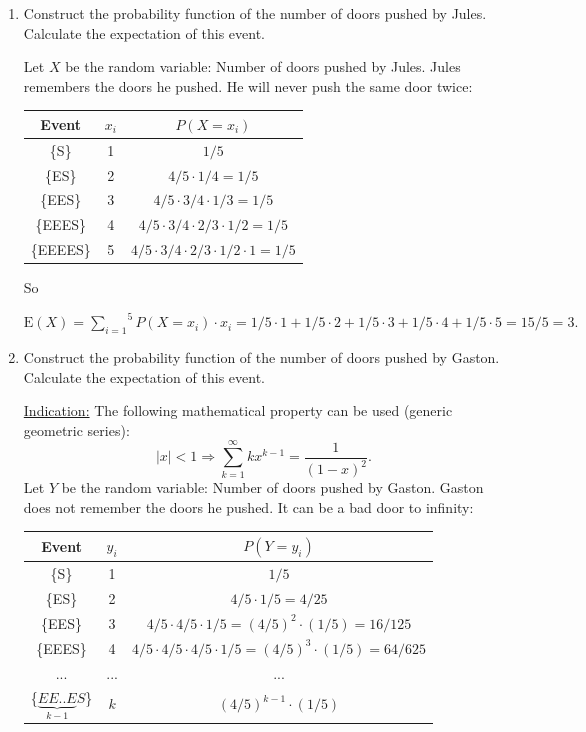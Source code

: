\documentclass[12pt,thmsa]{article}
\begin{document}
\begin{enumerate}%
\item Construct the probability function of the number of doors pushed by Jules. Calculate the expectation of this event.

Let $X$ be the random variable: Number of doors pushed by Jules. Jules remembers the doors he pushed. He will never push the same door twice:

\begin{center}
\begin{tabular}{|c|c|c|}
\hline
Event & $x_i$ & $P(X=x_i)$ \\[1mm]
\hline
\{S\} & 1 & $1/5$\\[1mm]
\hline
\{ES\} & 2 & $4/5\cdot 1/4=1/5$\\[1mm]
\hline
\{EES\} & 3 & $4/5\cdot 3/4\cdot 1/3=1/5$\\[1mm]
\hline
\{EEES\} & 4 & $4/5\cdot 3/4\cdot 2/3\cdot 1/2=1/5$\\[1mm]
\hline
\{EEEES\} & 5 & $4/5\cdot 3/4\cdot 2/3\cdot 1/2\cdot1=1/5$\\[1mm]
\hline
\end{tabular}
\end{center}

So
\begin{center}
$\mbox{E}(X) = \overset{5}{\underset{i=1}{\sum}}P(X=x_i)\cdot x_i = 1/5\cdot1+1/5\cdot2+1/5\cdot3+1/5\cdot4+1/5\cdot5=15/5=3. $
\end{center}

\item Construct the probability function of the number of doors pushed by Gaston. Calculate the expectation of this event.

\noindent \underline{Indication:} The following mathematical property can be used (generic geometric series):
$$|x|<1 \Rightarrow \sum_{k=1}^{\infty} k x^{k-1} = \frac{1}{(1-x)^2}.$$
Let $ Y $ be the random variable: Number of doors pushed by Gaston. Gaston does not remember the doors he pushed. It can be a bad door to infinity:
\begin{center}
\begin{tabular}{|c|c|c|}
\hline
Event & $y_i$ & $P(Y=y_i)$ \\[1mm]
\hline
\{S\} & 1 & $1/5$\\[1mm]
\hline
\{ES\} & 2 & $4/5\cdot 1/5=4/25$\\[1mm]
\hline
\{EES\} & 3 & $4/5\cdot 4/5\cdot 1/5=(4/5)^2\cdot(1/5)=16/125$\\[1mm]
\hline
\{EEES\} & 4 & $4/5\cdot 4/5\cdot 4/5\cdot 1/5=(4/5)^3\cdot(1/5)=64/625 $\\[1mm]
\hline
... & ... & ... \\[1mm]
\hline
\{$\underset{k-1}{\underbrace{EE..E}}S$\} & $k$ & $(4/5)^{k-1}\cdot(1/5)$\\[1mm]
\hline
\end{tabular}
\end{center}


\end{enumerate}
\end{document}
